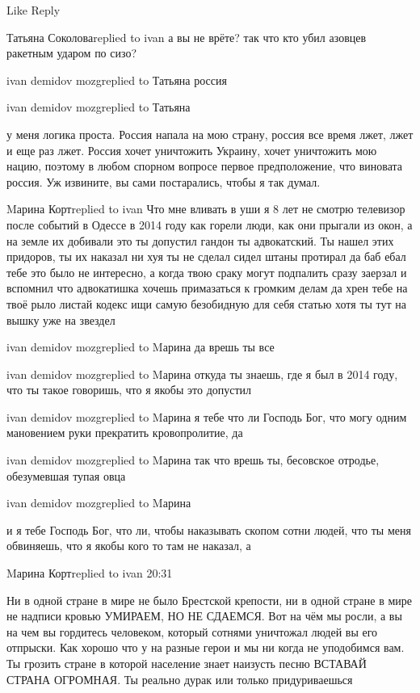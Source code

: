     Like
    Reply

Татьяна Соколоваreplied to ivan
а вы не врёте? так что кто убил азовцев ракетным ударом по сизо?

ivan demidov mozgreplied to Татьяна
россия

ivan demidov mozgreplied to Татьяна

у меня логика проста. Россия напала на мою страну, россия все время лжет, лжет
и еще раз лжет. Россия хочет уничтожить Украину, хочет уничтожить мою нацию,
поэтому в любом спорном вопросе первое предположение, что виновата россия. Уж
извините, вы сами постарались, чтобы я так думал.


Mарина Кортreplied to ivan
Что мне вливать в уши я 8 лет не смотрю телевизор после событий в Одессе в 2014 году как горели люди, как они прыгали из окон, а на земле их добивали это ты допустил гандон ты адвокатский. Ты нашел этих придоров, ты их наказал ни хуя ты не сделал сидел штаны протирал да баб ебал тебе это было не интересно, а когда твою сраку могут подпалить сразу заерзал и вспомнил что адвокатишка хочешь примазаться к громким делам да хрен тебе на твоё рыло листай кодекс ищи самую безобидную для себя статью хотя ты тут на вышку уже на звездел

ivan demidov mozgreplied to Mарина
да врешь ты все

ivan demidov mozgreplied to Mарина
откуда ты знаешь, где я был в 2014 году, что ты такое говоришь, что я якобы это допустил

ivan demidov mozgreplied to Mарина
я тебе что ли Господь Бог, что могу одним мановением руки прекратить кровопролитие, да

ivan demidov mozgreplied to Mарина
так что врешь ты, бесовское отродье, обезумевшая тупая овца

ivan demidov mozgreplied to Mарина

и я тебе Господь Бог, что ли, чтобы наказывать скопом сотни людей, что ты меня
обвиняешь, что я якобы кого то там не наказал, а

Mарина Кортreplied to ivan
20:31

Ни в одной стране в мире не было Брестской крепости, ни в одной стране в мире
не надписи кровью УМИРАЕМ, НО НЕ СДАЕМСЯ. Вот на чём мы росли, а вы на чем вы
гордитесь человеком, который сотнями уничтожал людей вы его отпрыски. Как
хорошо что у на разные герои и мы ни когда не уподобимся вам. Ты грозить стране
в которой население знает наизусть песню ВСТАВАЙ СТРАНА ОГРОМНАЯ. Ты реально
дурак или только придуриваешься


